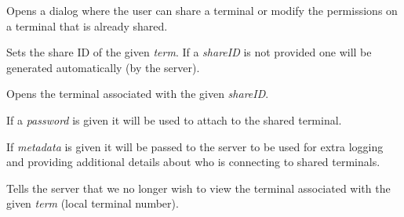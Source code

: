 \documentclass[letterpaper,10pt,openany]{sphinxmanual}
\begin{document}

\begin{fulllineitems}
\label{Applications/terminal/js_terminal:GateOne.Terminal.shareDialog}
Opens a dialog where the user can share a terminal or modify the permissions on a terminal that is already shared.

\end{fulllineitems}


\begin{fulllineitems}
\label{Applications/terminal/js_terminal:GateOne.Terminal.setShareID}
Sets the share ID of the given \emph{term}.  If a \emph{shareID} is not provided one will be generated automatically (by the server).

\end{fulllineitems}


\begin{fulllineitems}
\label{Applications/terminal/js_terminal:GateOne.Terminal.attachSharedTerminal}
Opens the terminal associated with the given \emph{shareID}.

If a \emph{password} is given it will be used to attach to the shared terminal.

If \emph{metadata} is given it will be passed to the server to be used for extra logging and providing additional details about who is connecting to shared terminals.

\end{fulllineitems}


\begin{fulllineitems}
\label{Applications/terminal/js_terminal:GateOne.Terminal.detachSharedTerminal}
Tells the server that we no longer wish to view the terminal associated with the given \emph{term} (local terminal number).

\end{fulllineitems}
\end{document}
